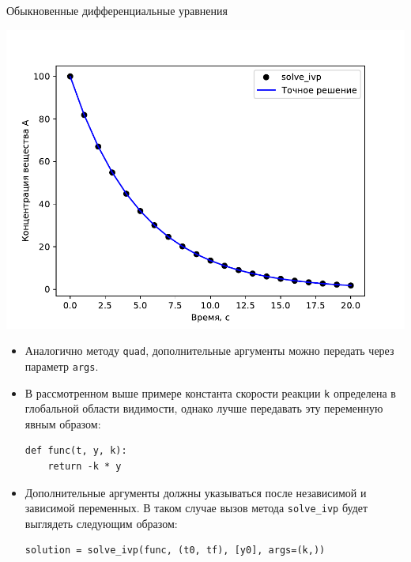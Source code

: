 \documentclass[aspectratio=169, mathserif]{beamer}	%
\begin{document}
\begin{frame}[fragile]{Обыкновенные дифференциальные уравнения}
\scriptsize
\begin{minipage}{.48\linewidth}
	\centering
	\includegraphics[width=\linewidth]{./pics/Figure_35}
\end{minipage}
\begin{minipage}{.5\linewidth}
\begin{itemize}
	\item Аналогично методу \texttt{quad}, дополнительные аргументы можно передать через параметр \texttt{args}. 
	\item В рассмотренном выше примере константа скорости реакции \texttt{k} определена в глобальной области видимости, однако лучше передавать эту переменную явным образом:
		
\begin{lstlisting}[language=iPython, numbers=none, frame=none]
def func(t, y, k):
    return -k * y
\end{lstlisting}
\end{itemize}
\end{minipage}
\begin{itemize}
	\item Дополнительные аргументы должны указываться после независимой и зависимой переменных. 
	В таком случае вызов метода \texttt{solve\_ivp} будет выглядеть следующим образом:
	
\begin{lstlisting}[language=iPython, numbers=none, frame=none]
solution = solve_ivp(func, (t0, tf), [y0], args=(k,))
\end{lstlisting}
\end{itemize}
\vfil
\end{frame}
\end{document}
